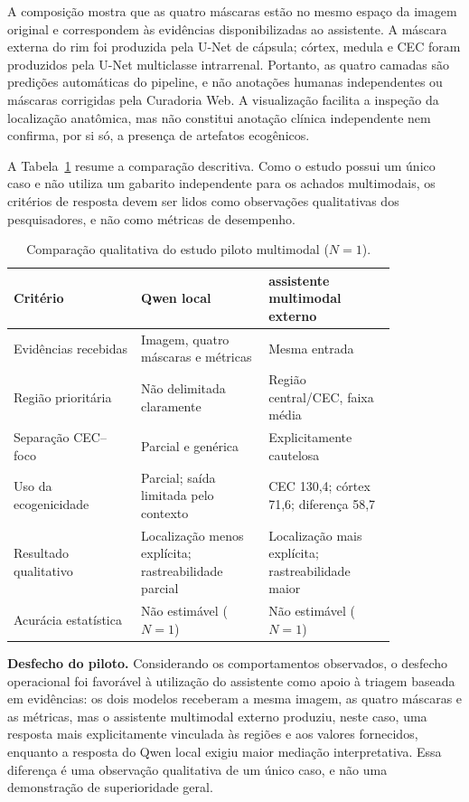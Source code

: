 \documentclass[12pt]{article}
\begin{document}
A composição mostra que as quatro máscaras estão no mesmo espaço da imagem original e correspondem às evidências disponibilizadas ao assistente. A máscara externa do rim foi produzida pela U-Net de cápsula; córtex, medula e CEC foram produzidos pela U-Net multiclasse intrarrenal. Portanto, as quatro camadas são predições automáticas do pipeline, e não anotações humanas independentes ou máscaras corrigidas pela Curadoria Web. A visualização facilita a inspeção da localização anatômica, mas não constitui anotação clínica independente nem confirma, por si só, a presença de artefatos ecogênicos.

A Tabela~\ref{tab:assistente_piloto} resume a comparação descritiva. Como o estudo possui um único caso e não utiliza um gabarito independente para os achados multimodais, os critérios de resposta devem ser lidos como observações qualitativas dos pesquisadores, e não como métricas de desempenho.

\begin{table}[!htbp]
\centering
\caption[Comparação qualitativa do piloto multimodal]{Comparação qualitativa do estudo piloto multimodal ($N=1$).}
\label{tab:assistente_piloto}
\begin{tabular}{p{0.28\linewidth}p{0.28\linewidth}p{0.28\linewidth}}
\toprule
\textbf{Critério} & \textbf{Qwen local} & \textbf{assistente multimodal externo} \\
\midrule
Evidências recebidas & Imagem, quatro máscaras e métricas & Mesma entrada \\
Região prioritária & Não delimitada claramente & Região central/CEC, faixa média \\
Separação CEC--foco & Parcial e genérica & Explicitamente cautelosa \\
Uso da ecogenicidade & Parcial; saída limitada pelo contexto & CEC 130,4; córtex 71,6; diferença 58,7 \\
Resultado qualitativo & Localização menos explícita; rastreabilidade parcial & Localização mais explícita; rastreabilidade maior \\
Acurácia estatística & Não estimável ($N=1$) & Não estimável ($N=1$) \\
\bottomrule
\end{tabular}
\end{table}

\textbf{Desfecho do piloto.} Considerando os comportamentos observados, o
desfecho operacional foi favorável à utilização do assistente como apoio à
triagem baseada em evidências: os dois modelos receberam a mesma imagem, as
quatro máscaras e as métricas, mas o assistente multimodal externo produziu, neste caso, uma
resposta mais explicitamente vinculada às regiões e aos valores fornecidos,
enquanto a resposta do Qwen local exigiu maior mediação interpretativa. Essa
diferença é uma observação qualitativa de um único caso, e não uma demonstração
de superioridade geral.
\end{document}
